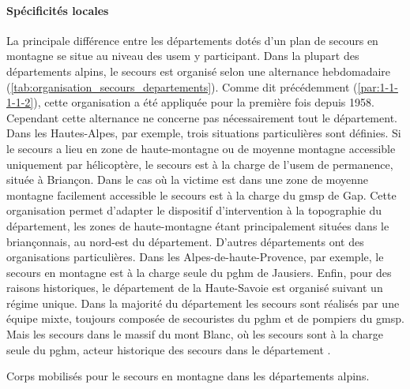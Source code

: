 \paragraph{Spécificités locales}

La principale différence entre les départements dotés d'un plan de
secours en montagne se situe au niveau des \ac{usem} y
participant. Dans la plupart des départements alpins, le secours est
organisé selon une alternance hebdomadaire
(\autoref{tab:organisation_secours_departements}). Comme dit
précédemment (\ref{par:1-1-1-1-2}), cette organisation a été appliquée
pour la première fois depuis 1958. Cependant cette alternance ne
concerne pas nécessairement tout le département. Dans les
Hautes-Alpes, par exemple, trois situations particulières sont
définies. Si le secours a lieu en zone de haute-montagne ou de moyenne
montagne accessible uniquement par hélicoptère, le secours est à la
charge de l'\ac{usem} de permanence, située à Briançon. Dans le cas où
la victime est dans une zone de moyenne montagne facilement accessible
le secours est à la charge du \ac{gmsp} de Gap. Cette organisation
permet d'adapter le dispositif d’intervention à la topographie du
département, les zones de haute-montagne étant principalement situées
dans le briançonnais, au nord-est du département. D'autres
départements ont des organisations particulières. Dans les
Alpes-de-haute-Provence, par exemple, le secours en montagne est à la
charge seule du \ac{pghm} de Jausiers. Enfin, pour des raisons
historiques, le département de la Haute-Savoie est organisé suivant un
régime unique. Dans la majorité du département les secours sont
réalisés par une équipe mixte, toujours composée de secouristes du
\ac{pghm} et de pompiers du \ac{gmsp}. Mais les secours dans le massif
du mont Blanc, où les secours sont à la charge seule du \ac{pghm},
acteur historique des secours dans le département
\autocite{Halle2007,Boillot2017}.

\begin{table}
  \centering
  
  \caption{Corps mobilisés pour le secours en montagne dans les
    départements alpins.}
  \label{tab:organisation_secours_departements}
\end{table}

